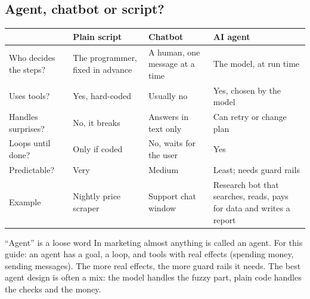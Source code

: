 \begin{center}
\end{center}

\subsection{Agent, chatbot or script?}
\begin{center}
\small
\begin{tabularx}{\textwidth}{@{}p{3.1cm}XXX@{}}
\toprule
 & \textbf{Plain script} & \textbf{Chatbot} & \textbf{AI agent} \\
\midrule
Who decides the steps? & The programmer, fixed in advance & A human, one message at a time & The model, at run time \\
Uses tools? & Yes, hard-coded & Usually no & Yes, chosen by the model \\
Handles surprises? & No, it breaks & Answers in text only & Can retry or change plan \\
Loops until done? & Only if coded & No, waits for the user & Yes \\
Predictable? & Very & Medium & Least; needs guard rails \\
Example & Nightly price scraper & Support chat window & Research bot that searches, reads, pays for data and writes a report \\
\bottomrule
\end{tabularx}
\end{center}

\begin{warningbox}{``Agent'' is a loose word}
In marketing almost anything is called an agent. For this guide: an agent has a goal, a loop, and tools with real effects (spending money, sending messages). The more real effects, the more guard rails it needs. The best agent design is often a mix: the model handles the fuzzy part, plain code handles the checks and the money.
\end{warningbox}

